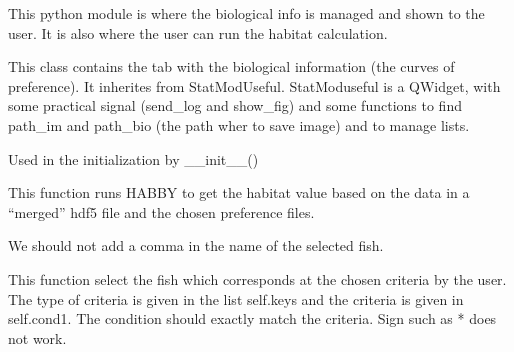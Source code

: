 \documentclass[letterpaper,10pt,english]{sphinxmanual}
\begin{document}
This python module is where the biological info is managed and shown to the user.
It is also where the user can run the habitat calculation.
\label{\detokenize{index:module-src_GUI.bio_info_GUI}}

\begin{fulllineitems}
\label{\detokenize{index:src_GUI.bio_info_GUI.BioInfo}}
This class contains the tab with the biological information (the curves of preference). It inherites from
StatModUseful. StatModuseful is a QWidget, with some practical signal (send\_log and show\_fig) and some functions
to find path\_im and path\_bio (the path wher to save image) and to manage lists.

\begin{fulllineitems}
\label{\detokenize{index:src_GUI.bio_info_GUI.BioInfo.init_iu}}
Used in the initialization by \_\_init\_\_()

\end{fulllineitems}


\begin{fulllineitems}
\label{\detokenize{index:src_GUI.bio_info_GUI.BioInfo.run_habitat_value}}
This function runs HABBY to get the habitat value based on the data in a ``merged'' hdf5 file and the chosen
preference files.

We should not add a comma in the name of the selected fish.

\end{fulllineitems}


\begin{fulllineitems}
\label{\detokenize{index:src_GUI.bio_info_GUI.BioInfo.select_fish}}
This function select the fish which corresponds at the chosen criteria by the user. The type of criteria
is given in the list self.keys and the criteria is given in self.cond1. The condition should exactly
match the criteria. Sign such as * does not work.


\end{fulllineitems}
\end{fulllineitems}
\end{document}
